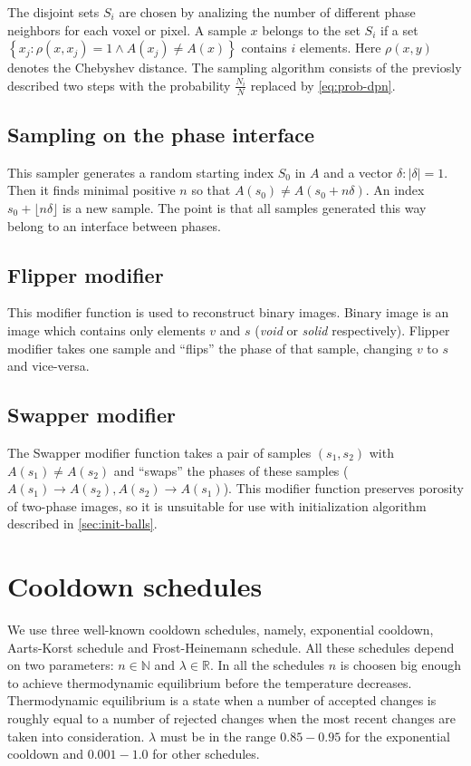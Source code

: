 \documentclass[preprint,amsmath,amssymb,aps,pre]{revtex4-1}
\begin{document}
The disjoint sets $S_i$ are chosen by analizing the number of different phase
neighbors for each voxel or pixel. A sample $x$ belongs to the set $S_i$ if a
set $\left\{ x_j: \rho(x, x_j) = 1 \land A(x_j) \ne A(x) \right\}$  contains $i$
elements. Here $\rho(x,y)$ denotes the Chebyshev distance. The sampling
algorithm consists of the previosly described two steps with the probability
$\frac{N_i}{N}$ replaced by \cref{eq:prob-dpn}.

\subsection{Sampling on the phase interface}
\label{sec:sampler-interface}
This sampler generates a random starting index $S_0$ in $A$ and a vector
$\delta: |\delta| = 1$. Then it finds minimal positive $n$ so that
$A(s_0) \ne A(s_0 + n\delta)$. An index $s_0 + \lfloor n\delta \rfloor$ is a new
sample. The point is that all samples generated this way belong to an interface
between phases.

\subsection{Flipper modifier}
\label{sec:flipper}
This modifier function is used to reconstruct binary images. Binary image is
an image which contains only elements $v$ and $s$ (\textit{void} or
\textit{solid} respectively). Flipper modifier takes one sample and ``flips''
the phase of that sample, changing $v$ to $s$ and vice-versa.

\subsection{Swapper modifier}
\label{sec:swapper}
The Swapper modifier function takes a pair of samples $(s_1, s_2)$ with
$A(s_1) \ne A(s_2)$ and ``swaps'' the phases of these samples
($A(s_1) \rightarrow A(s_2), A(s_2) \rightarrow A(s_1)$). This modifier function
preserves porosity of two-phase images, so it is unsuitable for use with
initialization algorithm described in \cref{sec:init-balls}.

\section{Cooldown schedules}
\label{sec:cooldown}
We use three well-known cooldown schedules, namely, exponential cooldown,
Aarts-Korst schedule \cite{Aarts-Korst} and Frost-Heinemann
\cite{Frost-Heinemann} schedule. All these schedules depend on two parameters:
$n \in \mathbb{N}$ and $\lambda \in \mathbb{R}$. In all the schedules $n$ is
choosen big enough to achieve thermodynamic equilibrium before the temperature
decreases. Thermodynamic equilibrium is a state when a number of accepted
changes is roughly equal to a number of rejected changes when the most recent
changes are taken into consideration. $\lambda$ must be in the range $0.85-0.95$
for the exponential cooldown and $0.001-1.0$ for other schedules.
\end{document}
